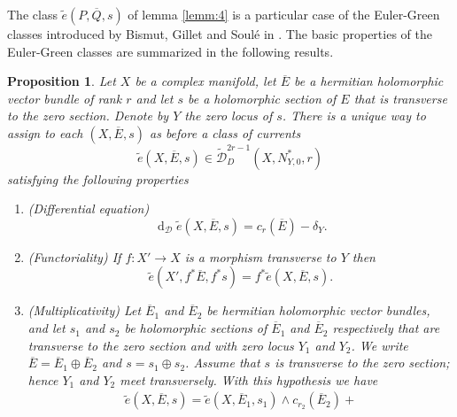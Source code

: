 \documentclass[10pt,twoside]{article}
\numberwithin{equation}{section}
\theoremstyle{plain}
\newtheorem{proposition}[equation]{Proposition}
\theoremstyle{definition}
\DeclareMathOperator{\dd}{d}
\begin{document}
The class $\widetilde e(P,\overline
  Q,s)$ of lemma \ref{lemm:4} is a particular case of the Euler-Green
  classes introduced by 
  Bismut, Gillet and Soul\'e in \cite{BismutGilletSoule:MR1086887}. 
The basic properties of the
Euler-Green classes are summarized in the following results.



\begin{proposition}\label{prop:14}
  Let $X$ be a complex manifold, let $\overline E$ be a  hermitian
  holomorphic 
  vector bundle of rank $r$ and let $s$ be a holomorphic section of
  $E$ that is 
  transverse to the zero section. Denote by $Y$ the zero locus of
  $s$. There is a unique way to assign to each $(X,\overline E,s)$ as
  before a class of currents
  \begin{displaymath}
    \widetilde e(X,\overline E,s)\in \widetilde
  {\mathcal{D}}^{2r-1}_{D}(X,N^{\ast}_{Y,0},r)
  \end{displaymath}
  satisfying the following properties
  \begin{enumerate}
  \item \label{item:8}(Differential equation)
    \begin{equation}
      \label{eq:51}
      \dd_{\mathcal{D}}\widetilde e(X,\overline E,s)=
      c_{r}(\overline E)-\delta _{Y}.
    \end{equation}
  \item \label{item:9}(Functoriality) If $f\colon X'\longrightarrow X$ is a morphism
    transverse to $Y$ then
    \begin{equation}
      \label{eq:52}
      \widetilde e(X',f^{\ast}\overline E,f^{\ast}s)=
      f^{\ast}\widetilde e(X,\overline E,s).
    \end{equation}
  \item \label{item:10} (Multiplicativity) Let $\overline E_{1}$ and
    $\overline E_{2}$ be
    hermitian holomorphic vector bundles, and let $s_{1}$ and $s_{2}$ be
    holomorphic sections of $\overline E_{1}$ and $\overline E_{2}$
    respectively that are transverse to the zero section and with zero
    locus $Y_{1}$  and $Y_{2}$. We write $\overline E=\overline
    E_{1}\oplus \overline E_{2}$ and $s=s_{1}\oplus s_{2}$. Assume
    that  $s$ is
    transverse to the zero section; hence $Y_{1}$ and $Y_{2}$ meet
    transversely. With this hypothesis we have
    \begin{multline*}
      \label{eq:53}
      \widetilde e(X,\overline E,s)=\widetilde e(X,\overline
      E_{1},s_{1})\land c_{r_{2}}(\overline E_{2})+

\end{multline*}
\end{enumerate}
\end{proposition}
\end{document}
